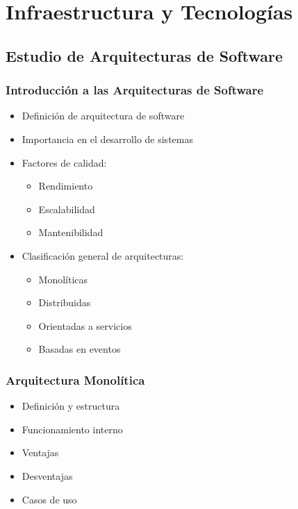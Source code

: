 
\chapter{Infraestructura y Tecnologías}
\label{cap:tecnologias}

\section{Estudio de Arquitecturas de Software}
\label{sec:estudio_arquitecturas}

\subsection{Introducción a las Arquitecturas de Software}
\begin{itemize}
    \item Definición de arquitectura de software
    \item Importancia en el desarrollo de sistemas
    \item Factores de calidad:
    \begin{itemize}
        \item Rendimiento
        \item Escalabilidad
        \item Mantenibilidad
    \end{itemize}
    \item Clasificación general de arquitecturas:
    \begin{itemize}
        \item Monolíticas
        \item Distribuidas
        \item Orientadas a servicios
        \item Basadas en eventos
    \end{itemize}
\end{itemize}

\subsection{Arquitectura Monolítica}
\begin{itemize}
    \item Definición y estructura
    \item Funcionamiento interno
    \item Ventajas
    \item Desventajas
    \item Casos de uso
\end{itemize}

